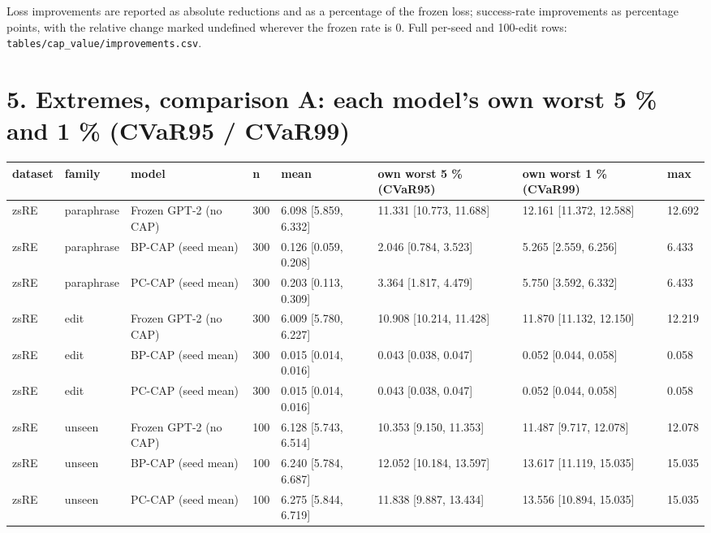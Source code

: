 \documentclass[10pt,a4paper]{article}
\begin{document}
Loss improvements are reported as absolute reductions and as a percentage of the frozen loss; success-rate improvements as percentage points, with the relative change marked undefined wherever the frozen rate is 0. Full per-seed and 100-edit rows: \texttt{tables/cap\_value/improvements.csv}.



\section*{5. Extremes, comparison A: each model's own worst 5 \% and 1 \% (CVaR95 / CVaR99)}



\begin{center}\scriptsize
\begin{tabularx}{\textwidth}{@{}p{}XXXXXXX@{}}
\toprule
dataset & family & model & n & mean & own worst 5 \% (CVaR95) & own worst 1 \% (CVaR99) & max \\ \midrule
zsRE & paraphrase & Frozen GPT-2 (no CAP) & 300 & 6.098 [5.859, 6.332] & 11.331 [10.773, 11.688] & 12.161 [11.372, 12.588] & 12.692 \\
zsRE & paraphrase & BP-CAP (seed mean) & 300 & 0.126 [0.059, 0.208] & 2.046 [0.784, 3.523] & 5.265 [2.559, 6.256] & 6.433 \\
zsRE & paraphrase & PC-CAP (seed mean) & 300 & 0.203 [0.113, 0.309] & 3.364 [1.817, 4.479] & 5.750 [3.592, 6.332] & 6.433 \\
zsRE & edit & Frozen GPT-2 (no CAP) & 300 & 6.009 [5.780, 6.227] & 10.908 [10.214, 11.428] & 11.870 [11.132, 12.150] & 12.219 \\
zsRE & edit & BP-CAP (seed mean) & 300 & 0.015 [0.014, 0.016] & 0.043 [0.038, 0.047] & 0.052 [0.044, 0.058] & 0.058 \\
zsRE & edit & PC-CAP (seed mean) & 300 & 0.015 [0.014, 0.016] & 0.043 [0.038, 0.047] & 0.052 [0.044, 0.058] & 0.058 \\
zsRE & unseen & Frozen GPT-2 (no CAP) & 100 & 6.128 [5.743, 6.514] & 10.353 [9.150, 11.353] & 11.487 [9.717, 12.078] & 12.078 \\
zsRE & unseen & BP-CAP (seed mean) & 100 & 6.240 [5.784, 6.687] & 12.052 [10.184, 13.597] & 13.617 [11.119, 15.035] & 15.035 \\
zsRE & unseen & PC-CAP (seed mean) & 100 & 6.275 [5.844, 6.719] & 11.838 [9.887, 13.434] & 13.556 [10.894, 15.035] & 15.035 \\

\end{tabularx}
\end{center}
\end{document}
